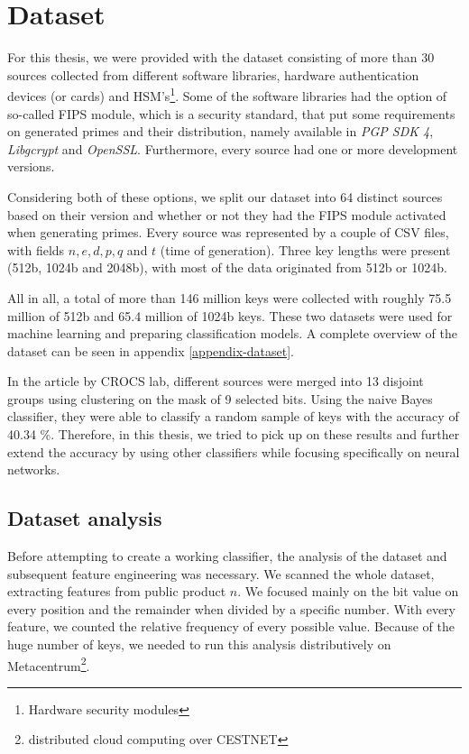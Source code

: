 \chapter{Dataset}
\label{chapter-dataset}

For this thesis, we were provided with the dataset consisting of more than 30 sources collected from different software libraries, hardware authentication devices (or cards) and HSM's\footnote{Hardware security modules}. 
Some of the software libraries had the option of so-called FIPS module, which is a security standard, that put some requirements on generated primes and their distribution, namely available in \textit{PGP SDK 4}, \textit{Libgcrypt} and \textit{OpenSSL}. Furthermore, every source had one or more development versions. 

Considering both of these options, we split our dataset into 64 distinct sources based on their version and whether or not they had the FIPS module activated when generating primes. Every source was represented by a couple of CSV files, with fields $n, e, d, p, q$ and $t$ (time of generation). Three key lengths were present (512b, 1024b and 2048b), with most of the data originated from 512b or 1024b.

All in all, a total of more than 146 million keys were collected with roughly 75.5 million of 512b and 65.4 million of 1024b keys. These two datasets were used for machine learning and preparing classification models. A complete overview of the dataset can be seen in appendix \ref{appendix-dataset}.

In the article by CROCS lab\cite{svenda_1}, different sources were merged into 13 disjoint groups using clustering on the mask of 9 selected bits. Using the naive Bayes classifier, they were able to classify a random sample of keys with the accuracy of 40.34 \%. Therefore, in this thesis, we tried to pick up on these results and further extend the accuracy by using other classifiers while focusing specifically on neural networks.

\section{Dataset analysis}

\label{chapter-analysis}

Before attempting to create a working classifier, the analysis of the dataset and subsequent feature engineering was necessary. We scanned the whole dataset, extracting features from public product $n$. We focused mainly on the bit value on every position and the remainder when divided by a specific number. With every feature, we counted the relative frequency of every possible value. Because of the huge number of keys, we needed to run this analysis distributively on Metacentrum\footnote{distributed cloud computing over CESTNET}.

